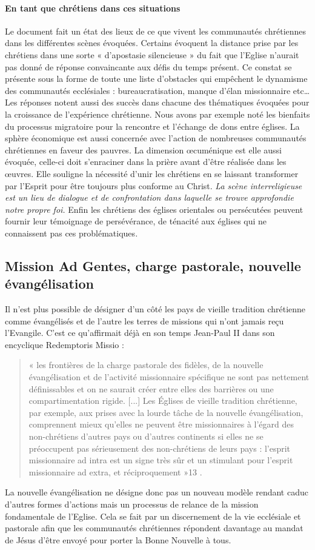 \paragraph{En tant que chrétiens dans ces situations}
Le document fait un état des lieux de ce que vivent les communautés chrétiennes dans les différentes
scènes évoquées. Certains évoquent la distance prise par les chrétiens dans une sorte « d’apostasie
silencieuse » du fait que l’Eglise n’aurait pas donné de réponse convaincante aux défis du temps
présent. Ce constat se présente sous la forme de toute une liste d’obstacles qui empêchent le
dynamisme des communautés ecclésiales : bureaucratisation, manque d’élan missionnaire etc…
Les réponses notent aussi des succès dans chacune des thématiques évoquées pour la croissance de
l’expérience chrétienne. Nous avons par exemple noté les bienfaits du processus migratoire pour la
rencontre et l’échange de dons entre églises. La sphère économique est aussi concernée avec l’action
de nombreuses communautés chrétiennes en faveur des pauvres. La dimension œcuménique est elle
aussi évoquée, celle-ci doit s’enraciner dans la prière avant d’être réalisée dans les œuvres. Elle
souligne la nécessité d’unir les chrétiens en se laissant transformer par l’Esprit pour être toujours plus
conforme au Christ. \textit{La scène interreligieuse est un lieu de dialogue et de confrontation dans laquelle
se trouve approfondie notre propre foi. }Enfin les chrétiens des églises orientales ou persécutées
peuvent fournir leur témoignage de persévérance, de ténacité aux églises qui ne connaissent pas ces
problématiques\textit{.}


\subsection{Mission Ad Gentes, charge pastorale, nouvelle évangélisation}
Il n’est plus possible de désigner d’un côté les pays de vieille tradition chrétienne comme évangélisés
et de l’autre les terres de missions qui n’ont jamais reçu l’Evangile. C’est ce qu’affirmait déjà en son
temps Jean-Paul II dans son encyclique Redemptoris Missio : \begin{quote}
    « les frontières de la charge pastorale
des fidèles, de la nouvelle évangélisation et de l'activité missionnaire spécifique ne sont pas nettement
définissables et on ne saurait créer entre elles des barrières ou une compartimentation rigide. [...] Les
Églises de vieille tradition chrétienne, par exemple, aux prises avec la lourde tâche de la nouvelle
évangélisation, comprennent mieux qu'elles ne peuvent être missionnaires à l'égard des non-chrétiens
d'autres pays ou d'autres continents si elles ne se préoccupent pas sérieusement des non-chrétiens de
leurs pays : l'esprit missionnaire ad intra est un signe très sûr et un stimulant pour l'esprit missionnaire
ad extra, et réciproquement »13
.
\end{quote}
La nouvelle évangélisation ne désigne donc pas un nouveau modèle rendant caduc d’autres formes
d’actions mais un processus de relance de la mission fondamentale de l’Eglise. Cela se fait par un
discernement de la vie ecclésiale et pastorale afin que les communautés chrétiennes répondent
davantage au mandat de Jésus d’être envoyé pour porter la Bonne Nouvelle à tous.
